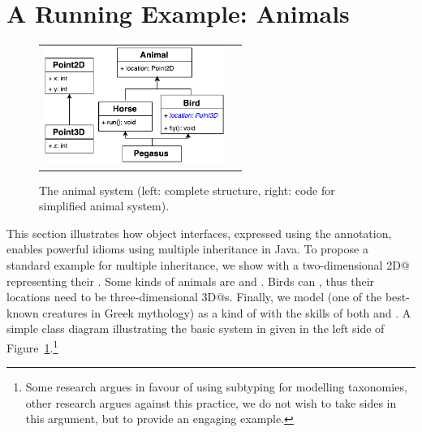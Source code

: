 \section{A Running Example: Animals}\label{sec:ep}

\begin{figure}
\begin{tabular}{c|c}
\includegraphics[height=3.8cm]{PegasusDetail.pdf}\hspace{20pt} &
\begin{minipage}{7cm}
\vspace{-90pt}
\end{minipage}
\end{tabular}
\caption{The animal system (left: complete structure, right: code for simplified animal system).}\label{fig:pegasus}
\end{figure}

This section illustrates how object interfaces, expressed using the \mixinAnn{} annotation, enables powerful
idioms using multiple inheritance in Java. 
To propose a standard example for multiple inheritance, we show \Q@Animal@s with a two-dimensional \Q@Point2D@ representing their \Q@location@.
Some kinds of animals are \Q@Horse@s and \Q@Bird@s.
Birds can \Q@fly@, thus their locations need to be three-dimensional \Q@Point3D@s.
Finally, we model \Q@Pegasus@ (one of the best-known creatures in Greek
mythology) as a kind of \Q@Animal@ with the skills
of both \Q@Horse@s and \Q@Bird@s. A simple class diagram illustrating
the basic system in given in the left side of Figure~\ref{fig:pegasus}.\footnote{
Some research argues in favour of using subtyping for modelling taxonomies, other research argues against this practice, we do not wish to take sides in this argument, but to provide an engaging example.}

